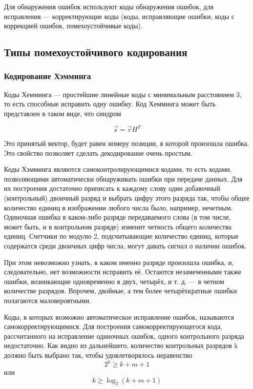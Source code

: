 Для обнаружения ошибок используют коды обнаружения ошибок, для исправления — корректирующие коды (коды, исправляющие ошибки, коды с коррекцией ошибок, помехоустойчивые коды).

\subsection{Типы помехоустойчивого кодирования}
\subsubsection{Кодирование Хэмминга}
Коды Хемминга — простейшие линейные коды с минимальным расстоянием 3, то есть способные исправить одну ошибку. Код Хемминга может быть представлен в таком виде, что синдром

\begin{equation}
\vec{s} = \vec{r} H^T
\end{equation}

Это принятый вектор, будет равен номеру позиции, в которой произошла ошибка. Это свойство позволяет сделать декодирование очень простым.

Коды Хэмминга являются самоконтролирующимися кодами, то есть кодами, позволяющими автоматически обнаруживать ошибки при передаче данных. Для их построения достаточно приписать к каждому слову один добавочный (контрольный) двоичный разряд и выбрать цифру этого разряда так, чтобы общее количество единиц в изображении любого числа было, например, нечетным. Одиночная ошибка в каком-либо разряде передаваемого слова (в том числе, может быть, и в контрольном разряде) изменит четность общего количества единиц. Счетчики по модулю 2, подсчитывающие количество единиц, которые содержатся среди двоичных цифр числа, могут давать сигнал о наличии ошибок.

При этом невозможно узнать, в каком именно разряде произошла ошибка, и, следовательно, нет возможности исправить её. Остаются незамеченными также ошибки, возникающие одновременно в двух, четырёх, и т. д. — в четном количестве разрядов. Впрочем, двойные, а тем более четырёхкратные ошибки полагаются маловероятными.

Коды, в которых возможно автоматическое исправление ошибок, называются самокорректирующимися. Для построения самокорректирующегося кода, рассчитанного на исправление одиночных ошибок, одного контрольного разряда недостаточно. Как видно из дальнейшего, количество контрольных разрядов k должно быть выбрано так, чтобы удовлетворялось неравенство 
\begin{equation}
2^{k}\geq k+m+1
\end{equation}
или  
\begin{equation}
k \geq \log _{2}(k+m+1) 
\end{equation}

